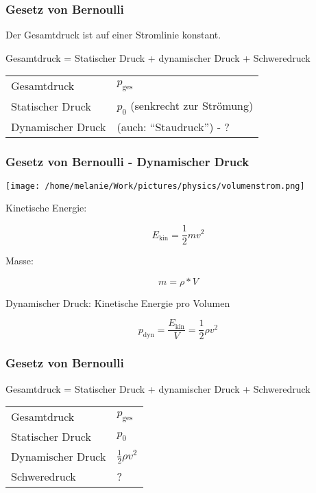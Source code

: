 \documentclass{beamer}
\begin{document}

\begin{frame}
\frametitle{Gesetz von Bernoulli}

Der Gesamtdruck ist auf einer Stromlinie konstant. \\[0.5 cm]

\pause

Gesamtdruck = Statischer Druck + dynamischer Druck + Schweredruck \\[0.5 cm]


\begin{tabular}{ll}
Gesamtdruck     & \(p_{\text{ges}}\)     \\[0.2 cm]
Statischer Druck        & \(p_0\)  (senkrecht zur Strömung)   \\[0.2 cm]
Dynamischer Druck       & (auch: ``Staudruck'') \pause - ? \\
\end{tabular}


\end{frame}

\begin{frame}
\frametitle{Gesetz von Bernoulli - Dynamischer Druck}

\begin{center}
\texttt{[image: /home/melanie/Work/pictures/physics/volumenstrom.png]}
\end{center}

Kinetische Energie:

\[
E_{\text{kin}} = \frac{1}{2} m v^2
\]

\pause
Masse: 

\[
m = \rho * V
\]

\pause
Dynamischer Druck: Kinetische Energie pro Volumen

\[
p_{\text{dyn}} = \frac{E_{\text{kin}}}{V} =  \frac{1}{2} \rho v^2
\]


\end{frame}


\begin{frame}
\frametitle{Gesetz von Bernoulli}



Gesamtdruck = Statischer Druck + dynamischer Druck + Schweredruck \\[0.5 cm]


\begin{tabular}{ll}
Gesamtdruck     & \(p_{\text{ges}}\)     \\[0.2 cm]
Statischer Druck        & \(p_0\)     \\[0.2 cm]
Dynamischer Druck       & \(\frac{1}{2}\rho v^2\) \\[0.2 cm]
Schweredruck    & ? \\
\end{tabular}


\end{frame}
\end{document}
